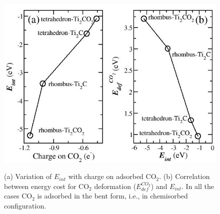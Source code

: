 \begin{figure}[ht]
 \begin{center}	
    \includegraphics[width=12cm]{Appendix2/Appendix2_figures/co2_plot.jpg} \\[0cm]
 \end{center}
 \caption{(a) Variation of $E_{int}$ with charge on adsorbed CO$_2$. (b) Correlation between
 energy cost for CO$_2$ deformation ($E_{def}^{CO_2}$) and $E_{int}$. In all the cases CO$_2$ is adsorbed
 in the bent form, i.e., in chemisorbed configuration.}
  \label{co2_int}
\end{figure}

